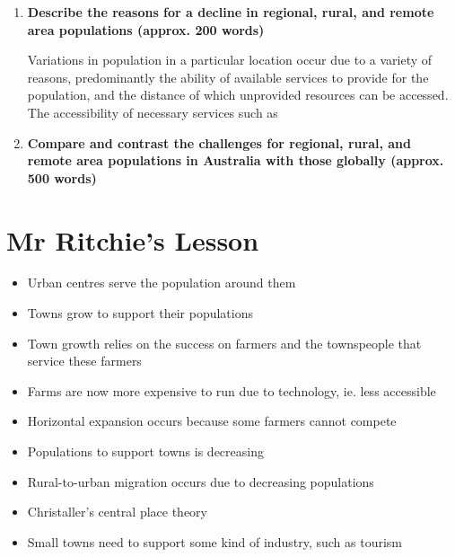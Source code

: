 		\begin{enumerate}
			\item \textbf{Describe the reasons for a decline in regional, rural, and remote area populations (approx. 200 words)}

				Variations in population in a particular location occur due to a variety of reasons, predominantly the ability of available services to provide for the population, and the distance of which unprovided resources can be accessed. The accessibility of necessary services such as 


			\item \textbf{Compare and contrast the challenges for regional, rural, and remote area populations in Australia with those globally (approx. 500 words)}
		\end{enumerate}

\section{Mr Ritchie's Lesson} \label{05/03/2025}

	\begin{itemize}
		\item Urban centres serve the population around them
		\item Towns grow to support their populations
		\item Town growth relies on the success on farmers and the townspeople that service these farmers
		\item Farms are now more expensive to run due to technology, ie. less accessible
		\item Horizontal expansion occurs because some farmers cannot compete
		\item Populations to support towns is decreasing
		\item Rural-to-urban migration occurs due to decreasing populations
		\item Christaller's central place theory
		\item Small towns need to support some kind of industry, such as tourism
	\end{itemize}

